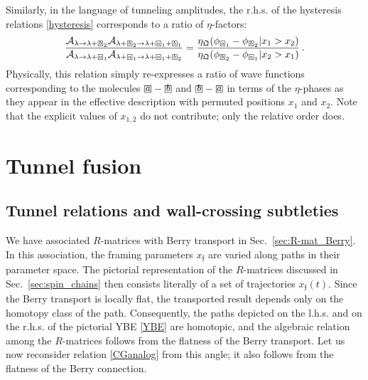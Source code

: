 \documentclass[10pt]{article}
\theoremstyle{definition}
\def\CA{{\cal A}}
\def\ff{\mathfrak{f}}
\def\fQ{\mathfrak{Q}}
\numberwithin{equation}{section}
\newcommand\sqbox[1]{{
		\setbox0=\hbox{\mbox{$\Box$}}
		\setbox1=\hbox{\mbox{\raisebox{0.35ex}{\small #1}}}
		\mbox{\raisebox{-0.2ex}{\rlap{\hbox to \wd0{\hss{\box1}\hss}}\box0}}
}}
\newcommand\ssqbox[1]{{
		\setbox0=\hbox{\mbox{$\scriptstyle\Box$}}
		\setbox1=\hbox{\mbox{\raisebox{0.35ex}{\tiny #1}}}
		\mbox{\raisebox{-0.2ex}{\rlap{\hbox to \wd0{\hss{\box1}\hss}}\box0}}
}}
\begin{document}
Similarly, in the language of tunneling amplitudes, the r.h.s. of the hysteresis relations \eqref{hysteresis} corresponds to a ratio of $\eta$-factors:
\begin{equation}
	\frac{\CA_{\lambda\to\lambda+\ssqbox{$b$}_2}\CA_{\lambda+\ssqbox{$b$}_2\to\lambda+\ssqbox{$a$}_1+\ssqbox{$b$}_1}}{\CA_{\lambda\to\lambda+\ssqbox{$a$}_1}\CA_{\lambda+\ssqbox{$a$}_1\to\lambda+\ssqbox{$a$}_1+\ssqbox{$b$}_2}}=\frac{\eta_{\fQ}(\phi_{\ssqbox{$a$}_1}-\phi_{\ssqbox{$b$}_2}|x_1>x_2)}{\eta_{\fQ}(\phi_{\ssqbox{$b$}_2}-\phi_{\ssqbox{$a$}_1}|x_2>x_1)}\,.
\end{equation}
Physically, this relation simply re-expresses a ratio of wave functions corresponding to the molecules $\sqbox{$a$}-\sqbox{$b$}$ and $\sqbox{$b$}-\sqbox{$a$}$ in terms of the $\eta$-phases as they appear in the effective description with permuted positions $x_1$ and $x_2$.
Note that the explicit values of $x_{1,2}$ do not contribute; only the relative order does.





\section{Tunnel fusion}\label{sec:fusion}

\subsection{Tunnel relations and wall-crossing subtleties}\label{sec:subtle}


We have associated $R$-matrices with Berry transport in Sec.~\ref{sec:R-mat_Berry}.
In this association, the framing parameters $x_{\ff}$ are varied along paths in their parameter space.
The pictorial representation of the $R$-matrices discussed in Sec.~\ref{sec:spin_chains} then consists literally of a set of trajectories $x_{\ff}(t)$.
Since the Berry transport is locally flat, the transported result depends only on the homotopy class of the path.
Consequently, the paths depicted on the l.h.s. and on the r.h.s. of the pictorial YBE \eqref{YBE} are homotopic, and the algebraic relation among the $R$-matrices follows from the flatness of the Berry transport.
Let us now reconsider relation \eqref{CGanalog} from this angle; it also follows from the flatness of the Berry connection.
\end{document}
